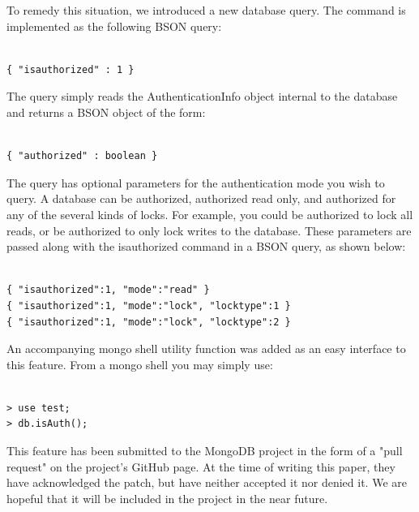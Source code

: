 \documentclass{../dependencies/acm_proc_article-sp}
\begin{document}
To remedy this situation, we introduced a new database query.
The command is implemented as the following BSON query:
\begin{lstlisting}

{ "isauthorized" : 1 }
\end{lstlisting}

The query simply reads the AuthenticationInfo object internal to the database
and returns a BSON object of the form:
\begin{lstlisting}

{ "authorized" : boolean }
\end{lstlisting}

The query has optional parameters for the authentication mode you wish to query.
A database can be authorized, authorized read only, and authorized for any
of the several kinds of locks. For example, you could be authorized to lock all
reads, or be authorized to only lock writes to the database.
These parameters are passed along with the isauthorized command in a BSON query, as shown below:
\begin{lstlisting}

{ "isauthorized":1, "mode":"read" }
{ "isauthorized":1, "mode":"lock", "locktype":1 }
{ "isauthorized":1, "mode":"lock", "locktype":2 }
\end{lstlisting}

An accompanying mongo shell utility function was added as an easy
interface to this feature. From a mongo shell you may simply use:
\begin{lstlisting}

> use test;
> db.isAuth();
\end{lstlisting}

This feature has been submitted to the MongoDB project in the form
of a "pull request" on the project's GitHub page\cite{4}.
At the time of writing this paper, they have acknowledged the patch, but have
neither accepted it nor denied it. We are hopeful that it will be included
in the project in the near future.
\end{document}
